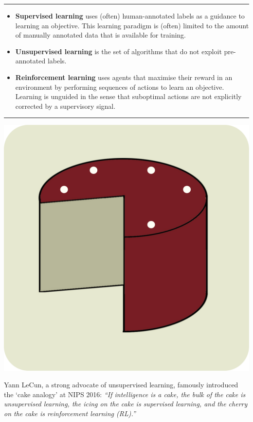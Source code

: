 
\noindent\rule{\textwidth}{0.5pt}

\begin{itemize}
    \item \textbf{Supervised learning} uses (often) human-annotated labels as a guidance to learning an objective. This learning paradigm is (often) limited to the amount of manually annotated data that is available for training.
    \item \textbf{Unsupervised learning} is the set of algorithms that do not exploit pre-annotated labels.
    \item \textbf{Reinforcement learning} uses agents that maximise their reward in an environment by performing sequences of actions to learn an objective. Learning is unguided in the sense that suboptimal actions are not explicitly corrected by a supervisory signal.
\end{itemize}

\noindent\rule{\textwidth}{0.5pt}

\begin{marginfigure}[{0cm}]
    \includegraphics[width=\textwidth]{figs/cake_analogy.pdf}
    \caption{Yann LeCun, a strong advocate of unsupervised learning, famously introduced the `cake analogy' at NIPS 2016: \textit{``If intelligence is a cake, the bulk of the cake is unsupervised learning, the icing on the cake is supervised learning, and the cherry on the cake is reinforcement learning (RL).''}}
    \label{fig:cake_analogy}
\end{marginfigure}



